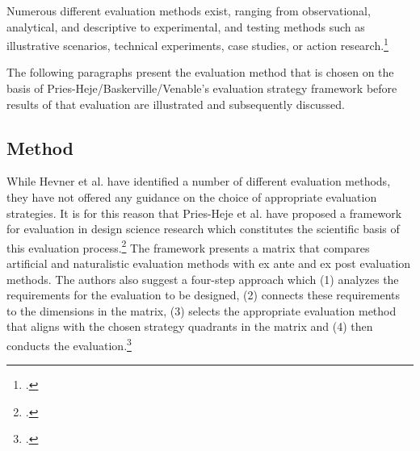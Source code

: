 
Numerous different evaluation methods exist, ranging from observational, analytical, and descriptive to experimental, and testing methods such as illustrative scenarios, technical experiments, case studies, or action research.\footcites[Cf.][p.86]{HevnerDesignScienceResearch2004}[cf.][p.4 et seq]{PfeffersDesignScienceResearch2012}

The following paragraphs present the evaluation method that is chosen on the basis of Pries-Heje/Baskerville/Venable's evaluation strategy framework before results of that evaluation are illustrated and subsequently discussed. 

\subsection{Method} \label{subsec:EvaluationMethod}

While Hevner et al. have identified a number of different evaluation methods, they have not offered any guidance on the choice of appropriate evaluation strategies. It is for this reason that Pries-Heje et al. have proposed a framework for evaluation in design science research which constitutes the scientific basis of this evaluation process.\footcites[Cf.][p.11 et seq]{Pries-HejeComprehensiveFrameworkEvaluation2012} The framework presents a matrix that compares artificial and naturalistic evaluation methods with ex ante and ex post evaluation methods. The authors also suggest a four-step approach which (1) analyzes the requirements for the evaluation to be designed, (2) connects these requirements to the dimensions in the matrix, (3) selects the appropriate evaluation method that aligns with the chosen strategy quadrants in the matrix and (4) then conducts the evaluation.\footcites[Cf.][p.13]{Pries-HejeComprehensiveFrameworkEvaluation2012} 

